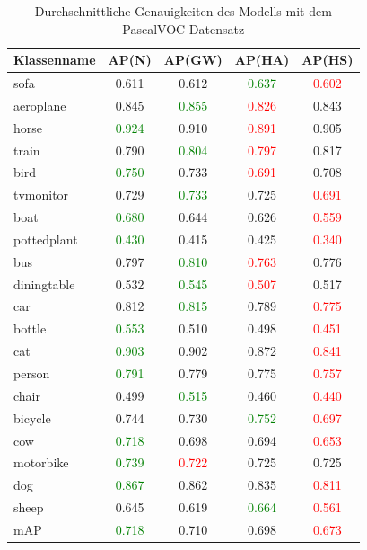 \documentclass[a4paper,12pt,oneside]{article}
\begin{document}
\begin{table}
[h]
\caption{Durchschnittliche Genauigkeiten des Modells mit dem PascalVOC Datensatz}
\centering
\begin{tabular}{|l|c|c|c|c|}
\hline
Klassenname & AP(N) & AP(GW) & AP(HA) & AP(HS)\\
\hline
sofa & 0.611 & 0.612 & \textcolor{green}{0.637} & \textcolor{red}{0.602}\\ 
aeroplane & 0.845 & \textcolor{green}{0.855} & \textcolor{red}{0.826} & 0.843\\
horse & \textcolor{green}{0.924} & 0.910 & \textcolor{red}{0.891} & 0.905\\
train & 0.790 & \textcolor{green}{0.804} & \textcolor{red}{0.797} & 0.817\\
bird & \textcolor{green}{0.750} & 0.733 & \textcolor{red}{0.691} & 0.708\\ 
tvmonitor & 0.729 & \textcolor{green}{0.733} & 0.725 & \textcolor{red}{0.691}\\
boat & \textcolor{green}{0.680} & 0.644 & 0.626 & \textcolor{red}{0.559}\\
pottedplant & \textcolor{green}{0.430} & 0.415 & 0.425 & \textcolor{red}{0.340}\\
bus & 0.797 & \textcolor{green}{0.810} & \textcolor{red}{0.763} & 0.776\\ 
diningtable & 0.532 & \textcolor{green}{0.545} & \textcolor{red}{0.507} & 0.517\\
car & 0.812 & \textcolor{green}{0.815} & 0.789 & \textcolor{red}{0.775}\\
bottle & \textcolor{green}{0.553} & 0.510 & 0.498 & \textcolor{red}{0.451}\\
cat & \textcolor{green}{0.903} & 0.902 & 0.872 & \textcolor{red}{0.841}\\
person & \textcolor{green}{0.791} & 0.779 & 0.775 & \textcolor{red}{0.757}\\
chair & 0.499 & \textcolor{green}{0.515} & 0.460 & \textcolor{red}{0.440}\\
bicycle & 0.744 & 0.730 & \textcolor{green}{0.752} & \textcolor{red}{0.697}\\
cow & \textcolor{green}{0.718} & 0.698 & 0.694 & \textcolor{red}{0.653}\\
motorbike & \textcolor{green}{0.739} & \textcolor{red}{0.722} & 0.725 & 0.725\\
dog & \textcolor{green}{0.867} & 0.862 & 0.835 & \textcolor{red}{0.811}\\
sheep & 0.645 & 0.619 & \textcolor{green}{0.664} & \textcolor{red}{0.561}\\
\hline
mAP & \textcolor{green}{0.718} & 0.710 & 0.698 & \textcolor{red}{0.673}\\
\hline
\end{tabular}
\end{table}
\end{document}
